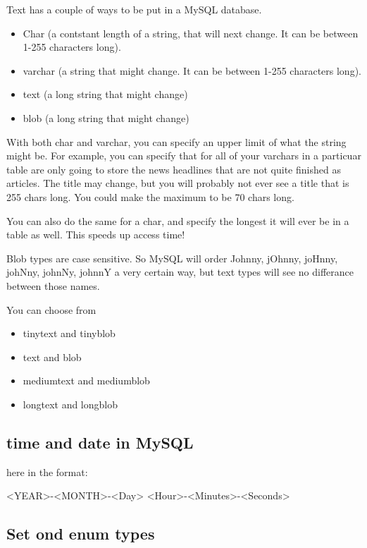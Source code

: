 \documentclass[11pt]{article}
\begin{document}
Text has a couple of ways to be put in a MySQL database.

\begin{itemize}
\item Char      (a contstant length of a string, that will next change.  It can be between 1-255 characters long).
\item varchar   (a string that might change.  It can be between 1-255 characters long).
\item text      (a long string that might change)
\item blob      (a long string that might change)
\end{itemize}

With both char and varchar, you can specify an upper limit of what the string might be.  For example, you can specify that for
all of your varchars in a particuar table are only going to store the news headlines that are not quite finished as articles.
The title may change, but you will probably not ever see a title that is 255 chars long.  You could make the maximum to be 70
chars long.

You can also do the same for a char, and specify the longest it will ever be in a table as well.  This speeds up access time!

Blob types are case sensitive.  So MySQL will order Johnny, jOhnny, joHnny, johNny, johnNy, johnnY a very certain way, but
text types will see no differance between those names.

You can choose from

\begin{itemize}
\item tinytext and tinyblob
\item text and blob
\item mediumtext and mediumblob
\item longtext and longblob
\end{itemize}

\subsection{time and date in MySQL}
\label{sec-1-3}

here in the format:

<YEAR>-<MONTH>-<Day> <Hour>-<Minutes>-<Seconds>

\subsection{Set ond enum types}
\label{sec-1-4}
\end{document}

